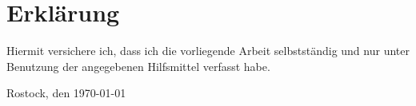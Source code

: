 \chapter*{Erklärung}
Hiermit versichere ich, dass ich die vorliegende Arbeit selbstständig und 
nur unter Benutzung der angegebenen Hilfsmittel verfasst habe.

\vspace{4\baselineskip}

Rostock, den \today

